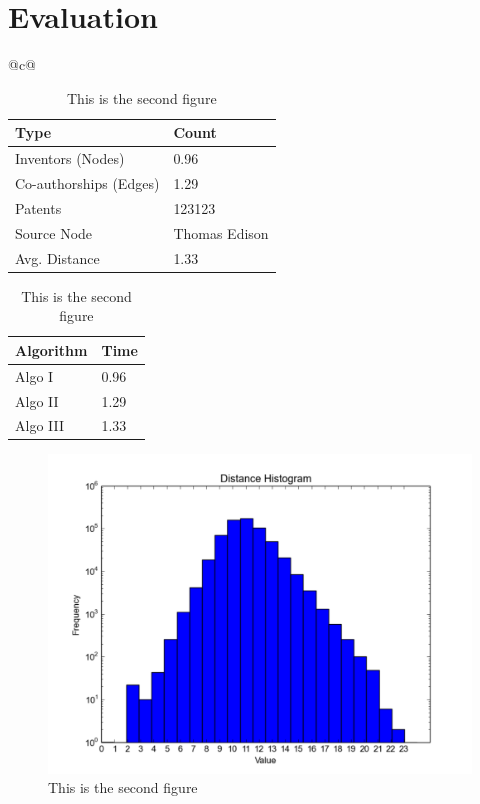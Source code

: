 \section{Evaluation}


\begin{table}[h] 
  \begin{tabular}{@{}c@{}} 
  \begin{minipage}{0.4\linewidth}
		\begin{center}
	  		\begin{tabular}{| l | l |}
				\hline
				{Type} & {Count} \\
				\hline
				\hline
				Inventors (Nodes) & 0.96 \\
				Co-authorships (Edges) & 1.29 \\
				Patents & 123123 \\
				Source Node & Thomas Edison\\
				Avg. Distance & 1.33 \\
				\hline
			\end{tabular}		
			\caption {Should be a caption}

			\vspace{0.85cm}

			\begin{tabular}{| l | l |}
				\hline
				{Algorithm} & {Time} \\
				\hline
				\hline
				Algo I & 0.96 \\
				Algo II & 1.29 \\
				Algo III & 1.33 \\
				\hline
			\end{tabular}
			\caption {Should be a caption}
		\end{center}

  \end{minipage}
  \hspace{0.05\linewidth}
  \begin{minipage}{0.45\linewidth}
      \begin{figure}[H]
          \includegraphics[scale=0.425]{../figures/distance.pdf}
          \caption{This is the second figure}
      \end{figure}
  \end{minipage}
  \end{tabular}
\end{table}

